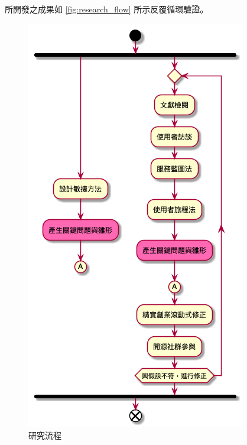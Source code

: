 \documentclass[12pt,a4paper]{article}
\begin{document}
所開發之成果如 \ref{fig:research_flow} 所示反覆循環驗證。
\begin{figure}[htbp]
\centering
\includegraphics[width=.9\linewidth]{./images/research_flow.png}
\caption{\label{fig:orga332b25}
研究流程}
\end{figure}
\end{document}

